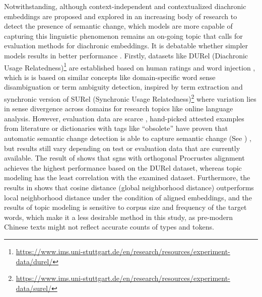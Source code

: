 Notwithstanding, although context-independent and contextualized diachronic embeddings are proposed and explored in an increasing body of research to detect the presence of semantic change, which models are more capable of capturing this linguistic phenomenon remains an on-going topic that calls for evaluation methods for diachronic embeddings. It is debatable whether simpler models results in better performance \parencite{schlechtweg2019wind}. Firstly, datasets like DURel (Diachronic Usage Relatedness)\footnote{\url{https://www.ims.uni-stuttgart.de/en/research/resources/experiment-data/durel/}} are established based on human ratings \parencite{schlechtweg2018diachronic} and word injection \parencite{schlechtweg2019wind}, which is is based on similar concepts like domain-specific word sense disambiguation or term ambiguity detection, inspired by term extraction and synchronic version of SURel (Synchronic Usage Relatedness)\footnote{\url{https://www.ims.uni-stuttgart.de/en/research/resources/experiment-data/surel/}} where variation lies in sense divergence across domains for research topics like online language analysis. However, evaluation data are scarce \parencite{wevers2020digital}, hand-picked attested examples from literature or dictionaries with tags like ``obsolete'' \parencite{hamilton2016cultural} have proven that automatic semantic change detection is able to capture semantic change (See ) \parencite{schlechtweg2019wind}, but results still vary depending on test or evaluation data that are currently available. The result of \textcite{schlechtweg2019wind} shows that \gls{sgns} with orthogonal Procrustes alignment achieves the highest performance based on the DURel dataset, whereas topic modeling has the least correlation with the examined dataset. Furthermore, the results in \textcite{schlechtweg2019wind,dubossarsky2017outta} shows that cosine distance (global neighborhood distance) outperforms local neighborhood distance under the condition of aligned embeddings, and the results of topic modeling is sensitive to corpus size and frequency of the target words, which make it a less desirable method in this study, as pre-modern Chinese texts might not reflect accurate counts of types and tokens.

